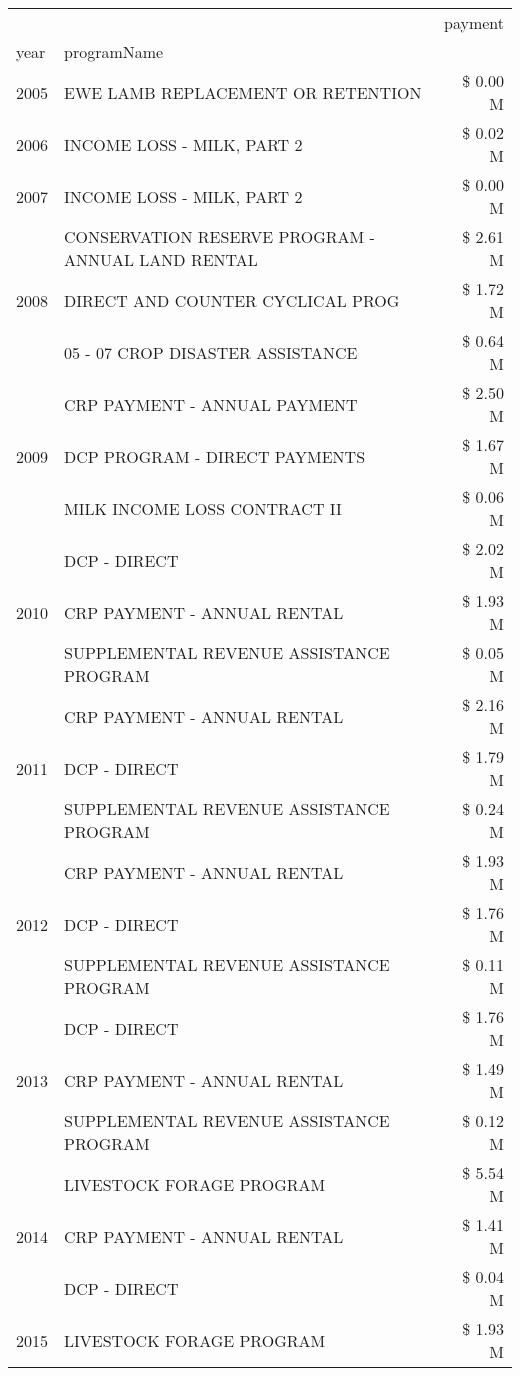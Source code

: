 \begin{tabular}{llr}
\toprule
 &  & payment \\
year & programName &  \\
\midrule
2005 & EWE LAMB REPLACEMENT OR RETENTION & \$ 0.00 M \\
\cline{1-3}
2006 & INCOME LOSS - MILK, PART 2 & \$ 0.02 M \\
\cline{1-3}
2007 & INCOME LOSS - MILK, PART 2 & \$ 0.00 M \\
\cline{1-3}
\multirow[t]{3}{*}{2008} & CONSERVATION RESERVE PROGRAM - ANNUAL LAND RENTAL & \$ 2.61 M \\
 & DIRECT AND COUNTER CYCLICAL PROG & \$ 1.72 M \\
 & 05 - 07 CROP DISASTER ASSISTANCE & \$ 0.64 M \\
\cline{1-3}
\multirow[t]{3}{*}{2009} & CRP PAYMENT - ANNUAL PAYMENT & \$ 2.50 M \\
 & DCP PROGRAM - DIRECT PAYMENTS & \$ 1.67 M \\
 & MILK INCOME LOSS CONTRACT II & \$ 0.06 M \\
\cline{1-3}
\multirow[t]{3}{*}{2010} & DCP - DIRECT & \$ 2.02 M \\
 & CRP PAYMENT - ANNUAL RENTAL & \$ 1.93 M \\
 & SUPPLEMENTAL REVENUE ASSISTANCE PROGRAM & \$ 0.05 M \\
\cline{1-3}
\multirow[t]{3}{*}{2011} & CRP PAYMENT - ANNUAL RENTAL & \$ 2.16 M \\
 & DCP - DIRECT & \$ 1.79 M \\
 & SUPPLEMENTAL REVENUE ASSISTANCE PROGRAM & \$ 0.24 M \\
\cline{1-3}
\multirow[t]{3}{*}{2012} & CRP PAYMENT - ANNUAL RENTAL & \$ 1.93 M \\
 & DCP - DIRECT & \$ 1.76 M \\
 & SUPPLEMENTAL REVENUE ASSISTANCE PROGRAM & \$ 0.11 M \\
\cline{1-3}
\multirow[t]{3}{*}{2013} & DCP - DIRECT & \$ 1.76 M \\
 & CRP PAYMENT - ANNUAL RENTAL & \$ 1.49 M \\
 & SUPPLEMENTAL REVENUE ASSISTANCE PROGRAM & \$ 0.12 M \\
\cline{1-3}
\multirow[t]{3}{*}{2014} & LIVESTOCK FORAGE PROGRAM & \$ 5.54 M \\
 & CRP PAYMENT - ANNUAL RENTAL & \$ 1.41 M \\
 & DCP - DIRECT & \$ 0.04 M \\
\cline{1-3}
\multirow[t]{3}{*}{2015} & LIVESTOCK FORAGE PROGRAM & \$ 1.93 M \\

\end{tabular}
